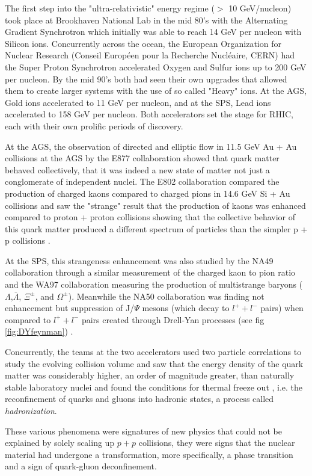 The first step into the "ultra-relativistic" energy regime ($>$ 10 GeV/nucleon) took place at Brookhaven National Lab in the mid 80's with the Alternating Gradient Synchrotron which initially was able to reach 14 GeV per nucleon with Silicon ions. Concurrently across the ocean, the European Organization for Nuclear Research (Conseil Européen pour la Recherche Nucléaire, CERN) had the Super Proton Synchrotron accelerated Oxygen and Sulfur ions up to 200 GeV per nucleon. By the mid 90's both had seen their own upgrades that allowed them to create larger systems with the use of so called "Heavy" ions. At the AGS, Gold ions accelerated to 11 GeV per nucleon, and at the SPS, Lead ions accelerated to 158 GeV per nucleon\citep{wojciechphenomenology}. Both accelerators set the stage for RHIC, each with their own prolific periods of discovery. 

At the AGS, the observation of directed and elliptic flow in 11.5 GeV Au + Au collisions at the AGS by the E877 collaboration \citep{Barrette:1999rx} showed that quark matter behaved collectively, that it was indeed a new state of matter not just a conglomerate of independent nuclei. The E802 collaboration compared the production of charged kaons compared to charged pions in 14.6 GeV Si + Au collisions and saw the "strange" result that the production of kaons was enhanced compared to proton + proton collisions showing that the collective behavior of this quark matter produced a different spectrum of particles than the simpler p + p collisions \citep{PhysRevLett.64.847}. 

At the SPS, this strangeness enhancement was also studied by the NA49\citep{Hohne:1999jf} collaboration through a similar measurement of the charged kaon to pion ratio and the WA97\citep{Antinori:1999hy} collaboration measuring the production of multistrange baryons ($\Lambda$,$\bar{\Lambda}$, $\Xi^{\pm}$, and $\Omega^{\pm}$). Meanwhile the NA50 collaboration was finding not enhancement but suppression of J/$\Psi$ mesons (which decay to $l^{+}+l^{-}$ pairs) when compared to $l^{+}+l^{-}$ pairs created through Drell-Yan processes (see fig \ref{fig:DYfeynman}) \citep{Abreu:2000ni}.

Concurrently, the teams at the two accelerators used two particle correlations to study the evolving collision volume and saw that the energy density of the quark matter was considerably higher, an order of magnitude greater, than naturally stable laboratory nuclei \citep{Heinz:1999rw} and found the conditions for thermal freeze out \citep{BraunMunzinger:1998cg}, i.e. the reconfinement of quarks and gluons into hadronic states, a process called \textit{hadronization}.

These various phenomena were signatures of new physics that could not be explained by solely scaling up $p+p$ collisions, they were signs that the nuclear material had undergone a transformation, more specifically, a phase transition and a sign of quark-gluon deconfinement. 
\pagebreak
\pagebreak
